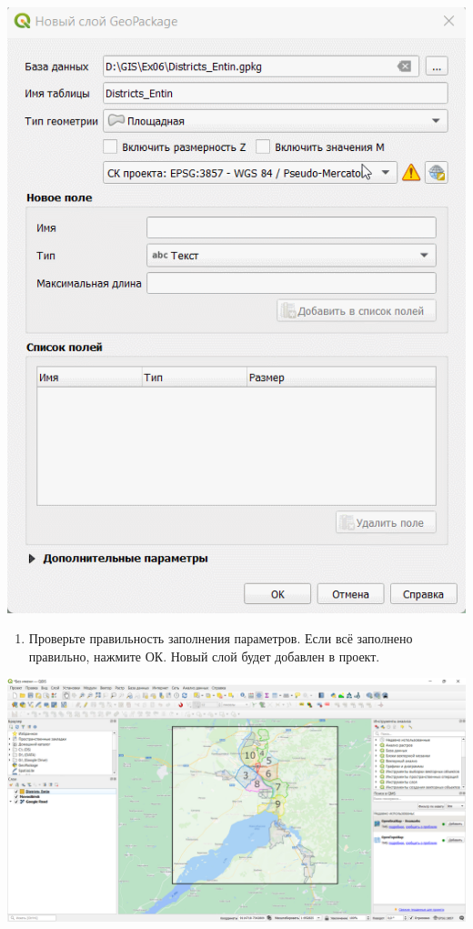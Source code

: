 \documentclass[
  12pt,
]{book}
\providecommand{\tightlist}{%
  \setlength{\itemsep}{0pt}\setlength{\parskip}{0pt}}
\begin{document}
\includegraphics{images/Ex05_Vectorization/new_field.gif}

\begin{enumerate}
\def\labelenumi{\arabic{enumi}.}
\setcounter{enumi}{3}
\tightlist
\item
  Проверьте правильность заполнения параметров. Если всё заполнено правильно, нажмите ОК. Новый слой будет добавлен в проект.
\end{enumerate}

\includegraphics{images/Ex05_Vectorization/new_layer.png}
\end{document}
